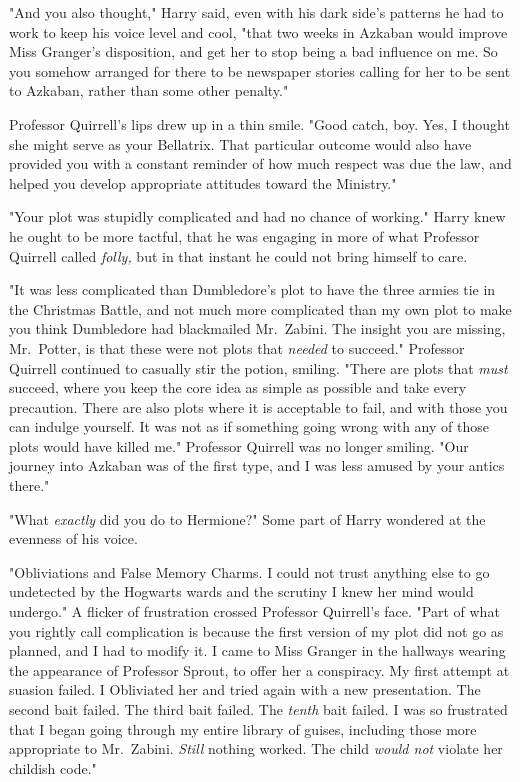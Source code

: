 "And you also thought," Harry said, even with his dark side's patterns he had 
to work to keep his voice level and cool, "that two weeks in Azkaban would 
improve Miss Granger's disposition, and get her to stop being a bad influence 
on me. So you somehow arranged for there to be newspaper stories calling for 
her to be sent to Azkaban, rather than some other penalty."

Professor Quirrell's lips drew up in a thin smile. "Good catch, boy. Yes, I 
thought she might serve as your Bellatrix. That particular outcome would also 
have provided you with a constant reminder of how much respect was due the law, 
and helped you develop appropriate attitudes toward the Ministry."

"Your plot was stupidly complicated and had no chance of working." Harry knew 
he ought to be more tactful, that he was engaging in more of what Professor 
Quirrell called \emph{folly,} but in that instant he could not bring himself to 
care.

"It was less complicated than Dumbledore's plot to have the three armies tie in 
the Christmas Battle, and not much more complicated than my own plot to make 
you think Dumbledore had blackmailed Mr.~Zabini. The insight you are missing, 
Mr.~Potter, is that these were not plots that \emph{needed} to succeed." 
Professor Quirrell continued to casually stir the potion, smiling. "There are 
plots that \emph{must} succeed, where you keep the core idea as simple as 
possible and take every precaution. There are also plots where it is acceptable 
to fail, and with those you can indulge yourself. It was not as if something 
going wrong with any of those plots would have killed me." Professor Quirrell 
was no longer smiling. "Our journey into Azkaban was of the first type, and I 
was less amused by your antics there."

"What \emph{exactly} did you do to Hermione?" Some part of Harry wondered at 
the evenness of his voice.

"Obliviations and False Memory Charms. I could not trust anything else to go 
undetected by the Hogwarts wards and the scrutiny I knew her mind would 
undergo." A flicker of frustration crossed Professor Quirrell's face. "Part of 
what you rightly call complication is because the first version of my plot did 
not go as planned, and I had to modify it. I came to Miss Granger in the 
hallways wearing the appearance of Professor Sprout, to offer her a conspiracy. 
My first attempt at suasion failed. I Obliviated her and tried again with a new 
presentation. The second bait failed. The third bait failed. The \emph{tenth} 
bait failed. I was so frustrated that I began going through my entire library 
of guises, including those more appropriate to Mr.~Zabini. \emph{Still} nothing 
worked. The child \emph{would not} violate her childish code."

